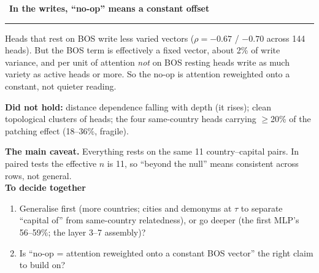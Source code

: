 \documentclass[10pt]{article}
\newcommand{\res}[2]{\par\vspace{5pt}{\large\bfseries\color{cblue}#1}\ {\large\bfseries #2}\\[-3pt]\rule{\linewidth}{0.5pt}\par}
\begin{document}
\res{3}{In the writes, ``no-op'' means a constant offset}
Heads that rest on BOS write less varied vectors ($\rho = -0.67$ / $-0.70$ across 144 heads). But the BOS term is
effectively a fixed vector, about 2\% of write variance, and per unit of attention \emph{not} on BOS resting heads
write as much variety as active heads or more. So the no-op is attention reweighted onto a constant, not quieter
reading.

\vspace{2pt}
{\small\color{ink2}\textbf{Did not hold:} distance dependence falling with depth (it rises); clean topological clusters
of heads; the four same-country heads carrying $\ge$20\% of the patching effect (18--36\%, fragile).}

\vspace{5pt}
\colorbox{plane}{\parbox{\dimexpr\linewidth-2\fboxsep}{\small
\textbf{The main caveat.} Everything rests on the same 11 country--capital pairs. In paired tests the effective $n$
is 11, so ``beyond the null'' means consistent across rows, not general.\\[3pt]
\textbf{To decide together}
\begin{enumerate}[leftmargin=1.4em]
\item Generalise first (more countries; cities and demonyms at $\tau$ to separate ``capital of'' from same-country
  relatedness), or go deeper (the first MLP's 56--59\%; the layer 3--7 assembly)?
\item Is ``no-op = attention reweighted onto a constant BOS vector'' the right claim to build on?
\end{enumerate}}}
\end{document}
